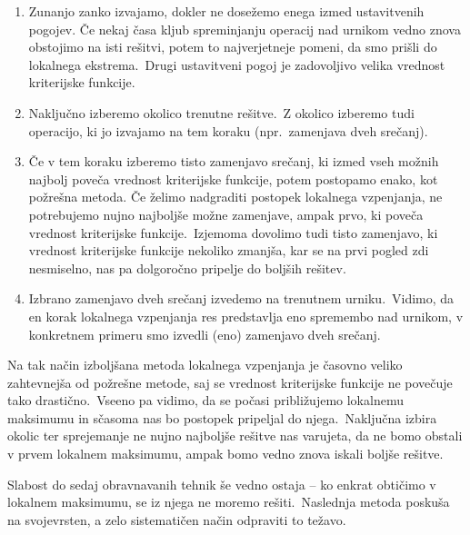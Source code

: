 \documentclass[a4paper,10pt]{article}
\begin{document}
\begin{enumerate}
  \item  Zunanjo zanko izvajamo, dokler ne dosežemo enega izmed ustavitvenih pogojev.
   Če nekaj časa kljub spreminjanju operacij nad urnikom vedno znova obstojimo na isti
   rešitvi, potem to najverjetneje pomeni, da smo prišli do lokalnega ekstrema.\ Drugi
   ustavitveni pogoj je zadovoljivo velika vrednost kriterijske funkcije.

   \item Naključno izberemo okolico trenutne rešitve.\ Z okolico izberemo tudi operacijo,
   ki jo izvajamo na tem koraku (npr.\ zamenjava dveh srečanj).

   \item Če v tem koraku izberemo tisto zamenjavo srečanj, ki izmed vseh možnih najbolj
   poveča vrednost kriterijske funkcije, potem postopamo enako, kot požrešna metoda. Če
   želimo nadgraditi postopek lokalnega vzpenjanja, ne potrebujemo nujno najboljše možne
   zamenjave, ampak prvo, ki poveča vrednost kriterijske funkcije.\ Izjemoma dovolimo tudi
   tisto zamenjavo, ki vrednost kriterijske funkcije nekoliko zmanjša, kar se na prvi
   pogled zdi nesmiselno, nas pa dolgoročno pripelje do boljših rešitev.

   \item Izbrano zamenjavo dveh srečanj izvedemo na trenutnem urniku.\ Vidimo, da en korak
   lokalnega vzpenjanja res predstavlja eno spremembo nad urnikom, v konkretnem primeru
   smo izvedli (eno) zamenjavo dveh srečanj.
   \end{enumerate}

Na tak način izboljšana metoda lokalnega vzpenjanja je časovno veliko zahtevnejša od
požrešne metode, saj se vrednost kriterijske funkcije ne povečuje tako drastično.\ Vseeno
pa vidimo, da se počasi približujemo lokalnemu maksimumu in sčasoma nas bo postopek
pripeljal do njega.\ Naključna izbira okolic ter sprejemanje ne nujno najboljše rešitve
nas varujeta, da ne bomo obstali v prvem lokalnem maksimumu, ampak bomo vedno znova
iskali boljše rešitve.

Slabost do sedaj obravnavanih tehnik še vedno ostaja -- ko enkrat obtičimo v lokalnem
maksimumu, se iz njega ne moremo rešiti.\ Naslednja metoda poskuša na svojevrsten, a zelo
sistematičen način odpraviti to težavo.
\end{document}
